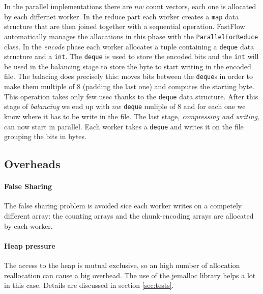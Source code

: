 \documentclass[12pt, letterpaper]{article}
\begin{document}
In the parallel implementations there are $nw$ count vectors, each one is allocated by each differnet worker. In the reduce part each worker creates a \texttt{map} data structure that are then joined together with a sequential operation. FastFlow automatically manages the allocations in this phase with the \texttt{ParallelForReduce} class. In the \textit{encode} phase each worker allocates a tuple containing a \texttt{deque} data structure and a \texttt{int}. The \texttt{deque} is used to store the encoded bits and the \texttt{int} will be used in the balancing stage to store the byte to start writing in the encoded file. The balacing does precisely this: moves bits between the \texttt{deque}s in order to make them multiple of 8 (padding the last one) and computes the starting byte. This operation takes only few usec thanks to the \texttt{deque} data structure. After this stage of \textit{balancing} we end up with $nw$ \texttt{deque} muliple of 8 and for each one we know where it has to be write in the file. The last stage, \textit{compressing and writing}, can now start in parallel. Each worker takes a \texttt{deque} and writes it on the file grouping the bits in bytes.



\subsection{Overheads}

\paragraph*{False Sharing}
The false sharing problem is avoided sice each worker writes on a competely different array: the counting arrays and the chunk-encoding arrays are allocated by each worker.

\paragraph*{Heap pressure}
The access to the heap is mutual exclusive, so an high number of allocation reallocation can cause a big overhead. The use of the jemalloc library helps a lot in this case. Details are discussed in section \ref{sec:tests}.
\end{document}
